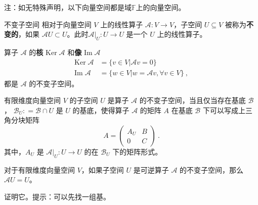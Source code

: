
\begin{issues}
\issueDraft
\end{issues}


注：如无特殊声明，以下向量空间都是域$\mathbb{F}$上的向量空间。

\begin{definition}{不变子空间}
相对于向量空间 $V$ 上的线性算子 $\mathcal{A}: V \rightarrow V$，子空间 $U \subseteq V$ 被称为\textbf{不变的}，如果 $\mathcal{A} U \subset U$。此时$\mathcal{A}|_U: U \to U$ 是一个 $U$ 上的线性算子。
\end{definition}

\begin{example}{}
算子 $\mathcal{A}$ 的\textbf{核} $\mathrm{Ker}\;\mathcal A$ 和\textbf{像} $\mathrm{Im}\;\mathcal{A}$
\begin{equation}\label{eq_InvSP_3}
\begin{aligned}
\mathrm{Ker}\;\mathcal{A}&=\{ v\in V|\mathcal{A} v= 0\}\\
\mathrm{Im}\;\mathcal{A}&=\{ w\in V| w=\mathcal{A} v,\forall v\in V\}~,
\end{aligned}
\end{equation}
都是 $\mathcal A$ 的不变子空间。
\end{example}

\begin{theorem}{}
有限维度向量空间 $V$ 的子空间 $U$ 是算子 $\mathcal{A}$ 的不变子空间，当且仅当存在基底 $\mathcal{B}$， $\mathcal{B}_U: = \mathcal{B} \cap U$ 是 $U$ 的基底，使得算子 $\mathcal{A}$ 的矩阵 $A$ 在基底 $\mathcal{B}$ 下可以写成上三角分块矩阵
\begin{equation}
A = \begin{pmatrix}
A_U & B\\
0 & C
\end{pmatrix}~.
\end{equation}
其中，$A_U$ 是 $\mathcal{A}|_{U}: U \to U$ 的在 $\mathcal{B}_U$ 下的矩阵形式。
\end{theorem}

\begin{theorem}{}
对于有限维度向量空间 $V$，如果子空间 $U$ 是可逆算子 $\mathcal{A}$ 的不变子空间，那么 $\mathcal{A} U = U$。
\end{theorem}
\begin{exercise}{}
证明它。提示：可以先找一组基。
\end{exercise}

